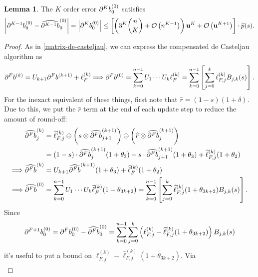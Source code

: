 \documentclass[3p, authoryear, square]{elsarticle}
\theoremstyle{definition}
\newtheorem{lemma}{Lemma}[section]
\newcommand{\bigO}[1]{\mathcal{O}\left(#1\right)}
\newcommand{\mach}{\mathbf{u}}
\newcommand{\db}[1]{
  \ifthenelse{\equal{#1}{1}}
             {\partial b}
             {\partial^{#1} b}
}
\newcommand{\cdb}[1]{
  \ifthenelse{\equal{#1}{1}}
             {\widehat{\partial b}}
             {\widehat{\partial^{#1} b}}
}
\begin{document}
\begin{lemma}\label{lemma:k-order}
The \(K\) order error \(\db{K}^{(0)}_0\) satisfies
\begin{equation}
  \left|\db{K - 1}^{(0)}_0 - \cdb{K - 1}^{(0)}_0\right| =
  \left|\db{K}^{(0)}_0\right| \leq
  \left[\left(3^{K} \binom{n}{K} + \bigO{n^{K - 1}}\right)
  \mach^{K} + \bigO{\mach^{K + 1}}\right] \cdot \widetilde{p}(s).
\end{equation}
\end{lemma}

\begin{proof}
As in \eqref{matrix-de-casteljau}, we can express the compensated
de Casteljau algorithm as
\begin{equation}
\db{F}^{(k)} = U_{k + 1} \db{F}^{(k + 1)} + \ell_{F}^{(k)}
\Longrightarrow \db{F}^{(0)} = \sum_{k = 0}^{n - 1}
U_1 \cdots U_k \ell_F^{(k)} = \sum_{k = 0}^{n - 1}
\left[\sum_{j = 0}^k \ell_{F, j}^{(k)} B_{j, k}(s)\right].
\end{equation}
For the inexact equivalent of these things, first note that
\(\widehat{r} = (1 - s)(1 + \delta)\). Due to this,
we put the \(\widehat{r}\) term at the end of each update step to reduce
the amount of round-off:
\begin{align}
  \cdb{F}_j^{(k)} &=
  \widehat{\ell}_{F, j}^{(k)} \oplus
  \left(s \otimes \cdb{F}_{j + 1}^{(k + 1)}\right) \oplus
  \left(\widehat{r} \otimes \cdb{F}_j^{(k + 1)}\right) \\
&= (1 - s) \cdot \cdb{F}_j^{(k + 1)}(1 + \theta_3) +
  s \cdot \cdb{F}_{j + 1}^{(k + 1)}(1 + \theta_3) +
  \widehat{\ell}_{F, j}^{(k)} (1 + \theta_2) \\
\Longrightarrow \cdb{F}^{(k)} &=
  U_{k + 1} \cdb{F}^{(k + 1)}(1 + \theta_3) +
  \widehat{\ell}_{F}^{(k)} (1 + \theta_2) \\
\Longrightarrow \cdb{F}^{(0)} &=
  \sum_{k = 0}^{n - 1}
  U_1 \cdots U_k \widehat{\ell}_F^{(k)} (1 + \theta_{3k + 2})
  = \sum_{k = 0}^{n - 1}
  \left[\sum_{j = 0}^k \widehat{\ell}_{F, j}^{(k)} (1 + \theta_{3k + 2})
    B_{j, k}(s)\right].
\end{align}
Since
\begin{equation}
\db{F + 1}_0^{(0)} = \db{F}_0^{(0)} - \cdb{F}_0^{(0)} = \sum_{k = 0}^{n - 1}
\sum_{j = 0}^k \left(\ell_{F, j}^{(k)} -
\widehat{\ell}_{F, j}^{(k)} (1 + \theta_{3k + 2})\right) B_{j, k}(s)
\end{equation}
it's useful to put a bound on \(\ell_{F, j}^{(k)} -
\widehat{\ell}_{F, j}^{(k)} (1 + \theta_{3k + 2})\). Via
\begin{align}

\end{align}
\end{proof}
\end{document}
